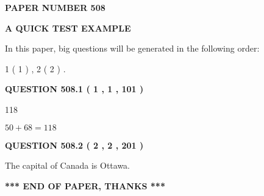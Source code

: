 \documentclass[12pt]{article}
\begin{document}
   
\newpage 
\setcounter{page}{ 
   508001 } 
   
   
   
   
 {\textbf{ \Large{ PAPER NUMBER  508  }}}
   
   
\vspace{0.2in}
   
   
   
   
   
   
 \vspace{0.2in}
{\LARGE {\textbf{ A QUICK TEST EXAMPLE}}}
   
   
   
\vspace{0.2in}
   
In this paper, big questions will be generated in the following order: 
   
   
   1 ( 1 )
 ,
   2 ( 2 )
 .
  
\vspace{0.2in}
  
{\textbf{\Large{QUESTION
508.1 
 ( 1 , 1 , 101 )
}}}
  
  
 
 
\noindent{}

118
 
 
 
 
\noindent{}

$ %
50 +  %
68=   %
118$
 
 
  
\vspace{0.2in}
  
{\textbf{\Large{QUESTION
508.2 
 ( 2 , 2 , 201 )
}}}
  
  
 
 
\noindent{}
 
 
The capital of Canada is Ottawa.
 
 
 
 
   
   
 \vspace{0.2in}
 
   
   
   
   
\vspace{1.0in} 
{\textbf{\large{ *** END OF PAPER, THANKS *** }}} 
   
\end{document}
